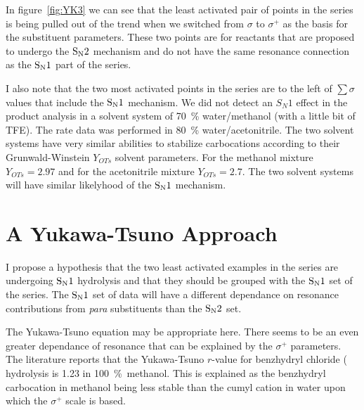 \documentclass{tufte-handout}
\begin{document}
In figure~\vref{fig:YK3} we can see that the least activated pair of points in the  series is being pulled out of the trend when we switched from $\sigma$ to $\sigma^+$ as the basis for the substituent parameters. These two points are for reactants that are proposed to undergo the $\rm S_N2$ mechanism and do not have the same resonance connection as the $\rm S_N1$ part of the series. 

I also note that the two most activated points in the  series are to the left of $\sum \sigma$ values that include the $\rm S_N1$ mechanism. We did not detect an $S_N1$ effect in the product analysis in a solvent system of \qty{70}{\percent} water/methanol (with a little bit of TFE). The rate data was performed in \qty{80}{\percent} water/acetonitrile. The two solvent systems have very similar abilities to stabilize carbocations according to their Grunwald-Winstein $Y_{OTs}$ solvent parameters. For the methanol mixture $Y_{OTs} = 2.97$ and for the acetonitrile mixture $Y_{OTs} = 2.7.$ The two solvent systems will have similar likelyhood of the $\rm S_N1$ mechanism.

\section{A Yukawa-Tsuno Approach}



I propose a hypothesis that the two least activated examples in the  series are undergoing $\rm S_N1$ hydrolysis and that they should be grouped with the $\rm S_N1$ set of the  series. The $\rm S_N1$ set of data will have a different dependance on resonance contributions from \textit{para} substituents than the $\rm S_N2$ set. 

The Yukawa-Tsuno equation may be appropriate here. There seems to be an even greater dependance of resonance that can be explained by the $\sigma^+$ parameters. The literature reports that the Yukawa-Tsuno $r$-value for benzhydryl chloride ( hydrolysis is 1.23 in \qty{100}{\percent}~methanol. This is explained as the benzhydryl carbocation in methanol being less stable than the cumyl cation in water upon which the $\sigma^+$ scale is based.  
\end{document}
